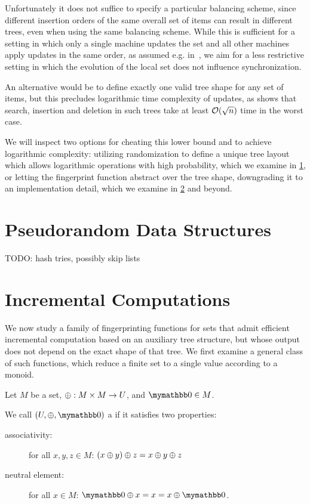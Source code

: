 Unfortunately it does not suffice to specify a particular balancing scheme, since different insertion orders of the same overall set of items can result in different trees, even when using the same balancing scheme. While this is sufficient for a setting in which only a single machine updates the set and all other machines apply updates in the same order, as assumed e.g. in~\cite{nissim1998certificate}, we aim for a less restrictive setting in which the evolution of the local set does not influence synchronization.

An alternative would be to define exactly one valid tree shape for any set of items, but this precludes logarithmic time complexity of updates, as \cite{uniquerepresentation} shows that search, insertion and deletion in such trees take at least $\mathcal{O}(\sqrt{n})$ time in the worst case.

We will inspect two options for cheating this lower bound and to achieve logarithmic complexity: utilizing randomization to define a unique tree layout which allows logarithmic operations with high probability, which we examine in \cref{randomization}, or letting the fingerprint function abstract over the tree shape, downgrading it to an implementation detail, which we examine in \cref{group-fingerprints} and beyond.

\section{Pseudorandom Data Structures}
\label{randomization}

TODO: hash tries, possibly skip lists


\section{Incremental Computations}
\label{group-fingerprints}

We now study a family of fingerprinting functions for sets that admit efficient incremental computation based on an auxiliary tree structure, but whose output does not depend on the exact shape of that tree. We first examine a general class of such functions, which reduce a finite set to a single value according to a monoid.

\begin{definition}
Let $M$ be a set, $\oplus: M \times M \rightarrow U$, and $\neutraladd \in M$.

We call $(U, \groupaddsym, \neutraladd)$ a  if it satisfies two properties:

  \begin{description}
    \item[associativity:] for all $x, y, z \in M$: ${({x} \oplus {y})} \oplus {z} = {x} \oplus {{y} \oplus{z}}$
    \item[neutral element:] for all $x \in M$: $\groupadd{\neutraladd}{x} = x = \groupadd{x}{\neutraladd}$.
  \end{description}
\end{definition}

